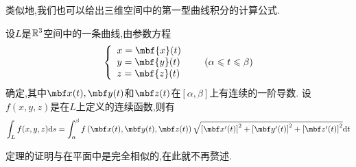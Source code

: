 \documentclass{ctexart}
\begin{document}
类似地,我们也可以给出三维空间中的第一型曲线积分的计算公式.
\begin{formal}[1.6 空间第一型曲线积分的计算]
    设$L$是$\mathbb{R}^3$空间中的一条曲线,由参数方程
    \[\left\{\begin{array}{l}
        x=\mbf{x}(t)\\y=\mbf{y}(t)\\z=\mbf{z}(t)
    \end{array}\right.\ \ \ \ \ (\alpha\leqslant t\leqslant\beta)\]
    确定,其中$\mbf x(t),\mbf y(t)$和$\mbf z(t)$在$[\alpha,\beta]$上有连续的一阶导数.%
    设$f(x,y,z)$是在$L$上定义的连续函数,则有
    \[\int_{L}f(x,y,z)\di s=\int_{\alpha}^{\beta}f\left(\mbf x(t),\mbf y(t),\mbf z(t)\right)\sqrt{\left[\mbf x'(t)\right]^2+\left[\mbf y'(t)\right]^2+\left[\mbf z'(t)\right]^2}\di t\]
\end{formal}\noindent
定理的证明与在平面中是完全相似的,在此就不再赘述.
\end{document}
